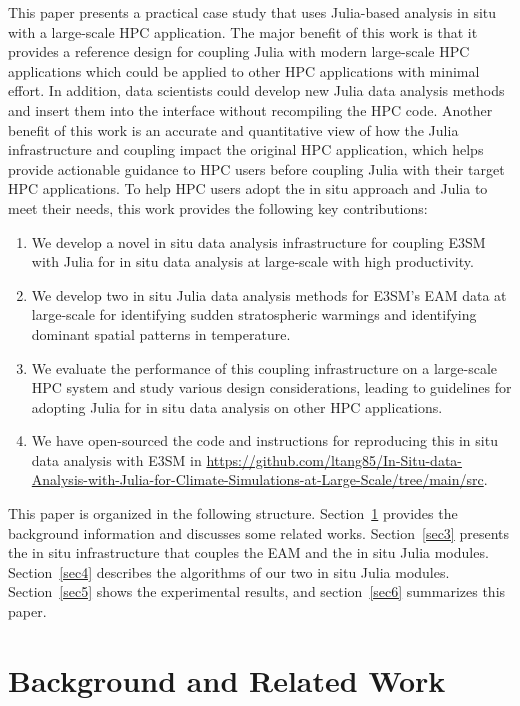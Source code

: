 \documentclass{juliacon}
\begin{document}
This paper presents a practical case study that uses Julia-based analysis in situ with a large-scale HPC application. The major benefit of this work is that it provides a reference design for coupling Julia with modern large-scale HPC applications which could be applied to other HPC applications with minimal effort.
In addition, data scientists could develop new Julia data analysis methods and insert them into the interface without recompiling the HPC code.
Another benefit of this work is an accurate and quantitative view of how the Julia infrastructure and coupling impact the original HPC application, which helps provide actionable guidance to HPC users before coupling Julia with their target HPC applications. To help HPC users adopt the in situ approach and Julia to meet their needs, this work provides the following key contributions:
\begin{enumerate}
\item We develop a novel in situ data analysis infrastructure for coupling E3SM with Julia for in situ data analysis at large-scale with high productivity.
\item We develop two in situ Julia data analysis methods for E3SM's EAM data at large-scale for identifying sudden stratospheric warmings and identifying dominant spatial patterns in temperature.
\item We evaluate the performance of this coupling infrastructure on a large-scale HPC system and study various design considerations, leading to guidelines for adopting Julia for in situ data analysis on other HPC applications.
\item We have open-sourced the code and instructions for reproducing this in situ data analysis with E3SM in \url{https://github.com/ltang85/In-Situ-data-Analysis-with-Julia-for-Climate-Simulations-at-Large-Scale/tree/main/src}.
\end{enumerate}


This paper is organized in the following structure. Section~\ref{sec2} provides the background information and discusses some related works. Section~\ref{sec3} presents the in situ infrastructure that couples the EAM and the in situ Julia modules. Section~\ref{sec4} describes the algorithms of our two in situ Julia modules. Section~\ref{sec5} shows the experimental results, and section~\ref{sec6} summarizes this paper.



\section{Background and Related Work} \label{sec2}
\end{document}
